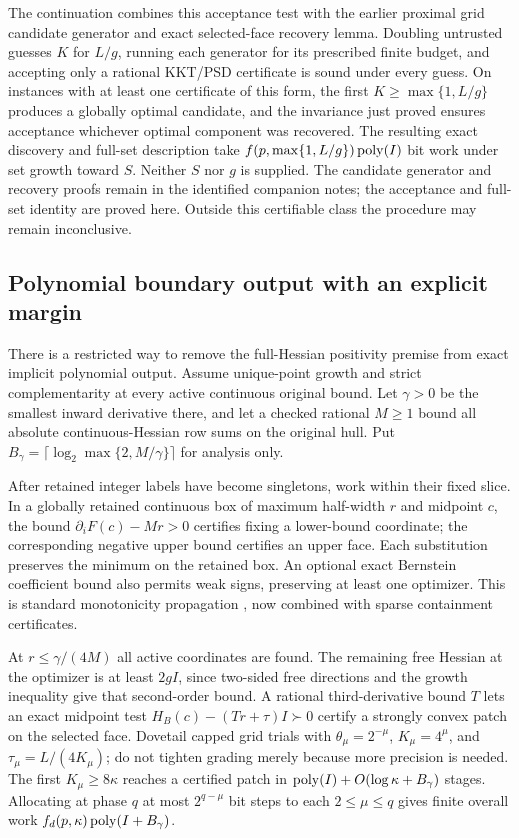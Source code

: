 The continuation combines this acceptance test with the earlier proximal
grid candidate generator and exact selected-face recovery lemma. Doubling
untrusted guesses $K$ for $L/g$, running each generator for its prescribed
finite budget, and accepting only a rational KKT/PSD certificate is sound
under every guess. On instances with at least one certificate of this
form, the first $K\ge\max\{1,L/g\}$ produces a globally optimal
candidate, and the invariance just proved ensures acceptance whichever
optimal component was recovered. The resulting exact discovery and
full-set description take $f(p,\max\{1,L/g\})\operatorname{poly}(I)$ bit work under
set growth toward $S$. Neither $S$ nor $g$ is supplied. The candidate
generator and recovery proofs remain in the identified companion notes;
the acceptance and full-set identity are proved here. Outside this
certifiable class the procedure may remain inconclusive.

\subsection{Polynomial boundary output with an explicit margin}
There is a restricted way to remove the full-Hessian positivity premise
from exact implicit polynomial output. Assume unique-point growth and
strict complementarity at every active continuous original bound.
Let $\gamma>0$ be the smallest inward derivative there, and let a checked
rational $M\ge1$ bound all absolute continuous-Hessian row sums on the
original hull. Put
$B_\gamma=\lceil\log_2\max\{2,M/\gamma\}\rceil$ for analysis only.

After retained integer labels have become singletons, work within their
fixed slice. In a globally retained continuous box of maximum half-width
$r$ and midpoint
$c$, the bound $\partial_iF(c)-Mr>0$ certifies fixing a lower-bound
coordinate; the corresponding negative upper bound certifies an upper
face. Each substitution preserves the minimum on the retained box.
An optional exact Bernstein coefficient bound also permits weak signs,
preserving at least one optimizer. This is standard monotonicity
propagation \cite{ArayaTrombettoniNeveu2010}, now combined with sparse
containment certificates.

At $r\le\gamma/(4M)$ all active coordinates are found. The remaining
free Hessian at the optimizer is at least $2gI$, since two-sided free
directions and the growth inequality give that second-order bound.
A rational third-derivative bound $T$ lets an exact midpoint test
$H_B(c)-(Tr+\tau)I\succ0$ certify a strongly convex patch on the
selected face. Dovetail capped grid trials with
$\theta_\mu=2^{-\mu}$, $K_\mu=4^\mu$, and
$\tau_\mu=L/(4K_\mu)$; do not tighten grading merely because more
precision is needed. The first $K_\mu\ge8\kappa$ reaches a certified
patch in $\operatorname{poly}(I)+O(\log\kappa+B_\gamma)$ stages.
Allocating at phase $q$ at most $2^{q-\mu}$ bit steps to each
$2\le\mu\le q$ gives finite overall work
$f_d(p,\kappa)\operatorname{poly}(I+B_\gamma)$.

